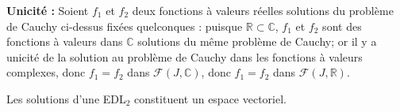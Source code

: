 \documentclass{article}
\renewenvironment{question_kholle}[2][ ]
{
	\subsection{\texorpdfstring{#2}{}}
	\notblank{#1}
	{
		\noindent #1
		\bigbreak
	}
	{}
	\begin{proof}
}
{
	\end{proof}
}
\begin{document}
\begin{question_kholle}
	\textbf{Unicité : }Soient $f_{1}$ et $f_{2}$ deux fonctions à valeurs réelles solutions du problème de Cauchy ci-dessus fixées quelconques : puisque $\mathbb{R} \subset \mathbb{C}$, $f_{1}$ et $f_{2}$ sont des fonctions à valeurs dans $\mathbb{C}$ solutions du même problème de Cauchy; or il y a unicité de la solution au problème de Cauchy dans les fonctions à valeurs complexes, donc $f_{1} = f_{2}$ dans $\mathcal{F}(J, \mathbb{C})$, donc $f_{1} = f_{2}$ dans $\mathcal{F}(J, \mathbb{R})$.
	\end{question_kholle}

	\begin{question_kholle}[
		Soient $(a,b)\in \mathbb{C}^2$, $f$ et $g$ les  solutions, définies sur $\mathbb{R}$ à valeurs
		dans $\mathbb{C}$, des problèmes de Cauchy suivants :
		\[
		    \left\{ \begin{array}{cl}
		        y'' +ay'+by = 0 \\
		        y(3) = 1\\
		        y'(3) = 0
		        \end{array} \right.
			\quad \text{et} \quad
		    \left\{ \begin{array}{cl}
		        y'' +ay'+by = 0 \\
		        y(3) = 0\\
		        y'(3) = 1
		        \end{array} \right.
		\]

		Comment s'exprime la solution définie sur $\mathbb{R}$ de $\left\{ \begin{array}{cl}
		    y'' +ay'+by = 0 \\
		    y(3) = \alpha \\
		    y'(3) = \beta
		    \end{array} \right. $ pour $(\alpha, \beta)\in \mathbb{R}^2$ fixés ?

		Peut-on affirmer que le plan vectoriel des solutions définies sur $\mathbb{R}$ à valeurs dans
		$\mathbb{C}$ de $y'' + ay' + by = 0$ est $\{ \lambda \cdot f + \mu \cdot g  |
		(\lambda, \mu)\in \mathbb{C}^2\}$
		]
		{Les solutions d'une EDL$_2$ constituent un espace vectoriel.}


\end{question_kholle}
\end{document}
